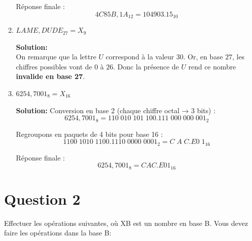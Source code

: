 \documentclass{article}
\begin{document}
\begin{enumerate}[label=\alph*), itemsep=2em]
    Réponse finale :
    \[
    4C85B,1A_{12} = 104903.15_{10}
    \]

    \item $LAME,DUDE_{27} = X_{9}$

    \textbf{Solution:} \\
    On remarque que la lettre $U$ correspond à la valeur $30$.  
    Or, en base $27$, les chiffres possibles vont de $0$ à $26$.  
    Donc la présence de $U$ rend ce nombre \textbf{invalide en base 27}.  

    \item $6254,7001_{8} = X_{16}$

    \textbf{Solution:}  
    Conversion en base 2 (chaque chiffre octal → 3 bits) :
    \[
    6254,7001_{8} = 110\;010\;101\;100.111\;000\;000\;001_{2}
    \]

    Regroupons en paquets de 4 bits pour base 16 :
    \[
    1100\;1010\;1100.1110\;0000\;0001_{2} = C\;A\;C.E0\;1_{16}
    \]

    Réponse finale :
    \[
    6254,7001_{8} = CAC.E01_{16}
    \]
\end{enumerate}

\newpage

\section*{Question 2}
Effectuer les opérations suivantes, où XB est un nombre en base B. Vous devez faire
les opérations dans la base B:
\end{document}
